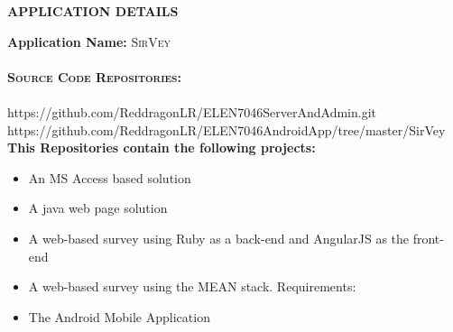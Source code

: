 \documentclass[12pt]{witseiepaper}
\begin{document}

 \thispagestyle{empty}\pagestyle{empty}
 \begin{center}
  \textsc{\bfseries APPLICATION DETAILS} \\ [1.0cm]
 \end{center}


  \textbf{Application Name:} \textsc{SirVey} \\
   \\
   \textbf{\textsc{Source Code Repositories:}}\\
   \\
	https://github.com/ReddragonLR/ELEN7046ServerAndAdmin.git \\
	https://github.com/ReddragonLR/ELEN7046AndroidApp/tree/master/SirVey \\

\textbf{This Repositories contain the following projects:}
\begin{itemize}
\item An MS Access based solution
\item A java web page solution
\item A web-based survey using Ruby as a back-end and AngularJS as the front-end
\item A web-based survey using the MEAN stack. Requirements:
\item The Android Mobile Application
\end{itemize}


\clearpage %

 \thispagestyle{empty}\pagestyle{empty}
 
 \newpage
 
 
\end{document}
